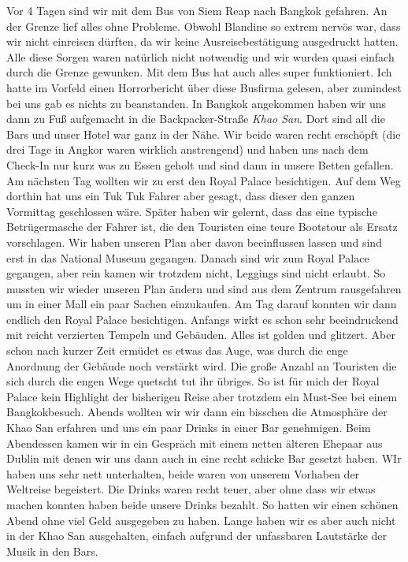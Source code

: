 \documentclass[11pt]{book}
\begin{document}
Vor 4 Tagen sind wir mit dem Bus von Siem Reap nach Bangkok gefahren. An der Grenze lief alles ohne Probleme. Obwohl Blandine 
so extrem nervös war, dass wir nicht einreisen  dürften, da wir keine Ausreisebestätigung ausgedruckt hatten. Alle diese Sorgen 
waren natürlich nicht notwendig und wir wurden quasi einfach durch die Grenze gewunken. Mit dem Bus hat auch alles super funktioniert.
Ich hatte im Vorfeld einen Horrorbericht über diese Busfirma gelesen, aber zumindest bei uns gab es nichts zu beanstanden. In Bangkok 
angekommen haben wir uns dann zu Fuß aufgemacht in die Backpacker-Straße \emph{Khao San}. Dort sind all die Bars und unser Hotel 
war ganz in der Nähe. Wir beide waren recht erschöpft (die drei Tage in Angkor waren wirklich anstrengend) und haben uns nach dem 
Check-In nur kurz was zu Essen geholt und sind dann in unsere Betten gefallen. 
Am nächsten Tag wollten wir zu erst den Royal Palace besichtigen. Auf dem Weg dorthin hat uns ein Tuk Tuk Fahrer aber gesagt, dass 
dieser den ganzen Vormittag geschlossen wäre. Später haben wir gelernt, dass das eine typische Betrügermasche der Fahrer ist, die 
den Touristen eine teure Bootstour als Ersatz vorschlagen. Wir haben unseren Plan aber davon beeinflussen lassen und sind erst 
in das National Museum gegangen. Danach sind wir zum Royal Palace gegangen, aber rein kamen wir trotzdem nicht, Leggings sind nicht 
erlaubt. So mussten wir wieder unseren Plan ändern und sind aus dem Zentrum rausgefahren um in einer Mall ein paar Sachen einzukaufen.
Am Tag darauf konnten wir dann endlich den Royal Palace besichtigen. Anfangs wirkt es schon sehr beeindruckend mit reicht verzierten 
Tempeln und Gebäuden. Alles ist golden und glitzert. Aber schon nach kurzer Zeit ermüdet es etwas das Auge, was durch die enge Anordnung 
der Gebäude noch verstärkt wird. Die große Anzahl an Touristen die sich durch die engen Wege quetscht tut ihr übriges. So ist für 
mich der Royal Palace kein Highlight der bisherigen Reise aber trotzdem ein Must-See bei einem Bangkokbesuch. Abends wollten wir
wir dann ein bisschen die Atmosphäre der Khao San erfahren und uns ein paar Drinks in einer Bar genehmigen. Beim Abendessen kamen 
wir in ein Gespräch mit einem netten älteren Ehepaar aus Dublin mit denen wir uns dann auch in eine recht schicke Bar gesetzt haben.
WIr haben uns sehr nett unterhalten, beide waren von unserem Vorhaben der Weltreise begeistert. Die Drinks waren recht teuer, aber 
ohne dass wir etwas machen konnten haben beide unsere Drinks bezahlt. So hatten wir einen schönen Abend ohne viel Geld ausgegeben zu haben.
Lange haben wir es aber auch nicht in der Khao San ausgehalten, einfach aufgrund der unfassbaren Lautstärke der Musik in den Bars. 
\end{document}
